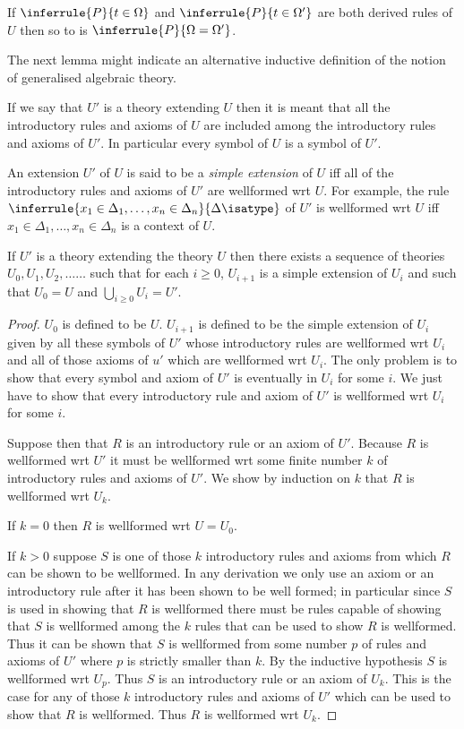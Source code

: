 \begin{corollary}
  If $\inferrule{P}{t\in\Omega}$ and $\inferrule{P}{t\in\Omega'}$ are both derived rules of $U$ then so to is $\inferrule{P}{\Omega=\Omega'}$.
\end{corollary}

The next lemma might indicate an alternative inductive definition of the notion of generalised algebraic theory.

If we say that $U'$ is a theory extending $U$ then it is meant that all the introductory rules and axioms of $U$ are included among the introductory rules and axioms of $U'$.
%
In particular every symbol of $U$ is a symbol of $U'$.

An extension $U'$ of $U$ is said to be a \emph{simple extension} of $U$ iff all of the introductory rules and axioms of $U'$ are wellformed wrt $U$.
%
For example, the rule $\inferrule{x_1\in\Delta_1,\ldots,x_n\in\Delta_n}{\Delta\isatype}$ of $U'$ is wellformed wrt $U$ iff $x_1\in\Delta_1,\ldots,x_n\in\Delta_n$ is a context of $U$.

\begin{lemma}[3]
  If $U'$ is a theory extending the theory $U$ then there exists a sequence of theories $U_0, U_1, U_2,\ldots\ldots$ such that for each $i\geq 0$, $U_{i+1}$ is a simple extension of $U_i$ and such that $U_0=U$ and $\bigcup_{i\geq 0} U_i= U'$.
\end{lemma}

\begin{proof}
  $U_0$ is defined to be $U$.
  $U_{i+1}$ is defined to be the simple extension of $U_i$ given by all these symbols of $U'$ whose introductory rules are wellformed wrt $U_i$ and all of those axioms of $u'$ which are wellformed wrt $U_i$.
  The only problem is to show that every symbol and axiom of $U'$ is eventually in $U_i$ for some $i$.
  We just have to show that every introductory rule and axiom of $U'$ is wellformed wrt $U_i$ for some $i$.

  Suppose then that $R$ is an introductory rule or an axiom of $U'$.
  Because $R$ is wellformed wrt $U'$ it must be wellformed wrt some finite number $k$ of introductory rules and axioms of $U'$.
  We show by induction on $k$ that $R$ is wellformed wrt $U_k$.

  If $k=0$ then $R$ is wellformed wrt $U=U_0$.

  If $k>0$ suppose $S$ is one of those $k$ introductory rules and axioms from which $R$ can be shown to be wellformed.
  In any derivation we only use an axiom or an introductory rule after it has been shown to be well formed; in particular since $S$ is used in showing that $R$ is wellformed there must be rules capable of showing that $S$ is wellformed among the $k$ rules that can be used to show $R$ is wellformed.
  Thus it can be shown that $S$ is wellformed from some number $p$ of rules and axioms of $U'$ where $p$ is strictly smaller than $k$. By the inductive hypothesis $S$ is wellformed wrt $U_p$.
  Thus $S$ is an introductory rule or an axiom of $U_k$.
  This is the case for any of those $k$ introductory rules and axioms of $U'$ which can be used to show that $R$ is wellformed.
  Thus $R$ is wellformed wrt $U_k$.
\end{proof}

